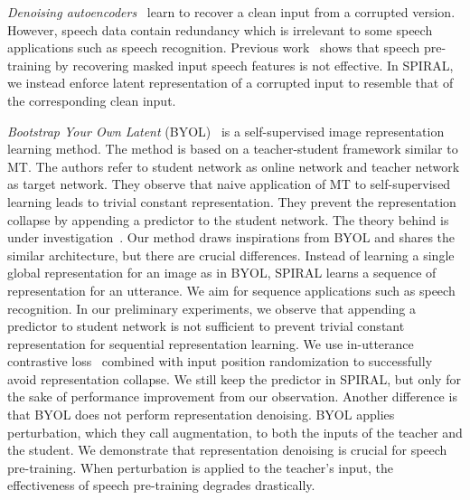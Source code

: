 \textit{Denoising autoencoders}~\citep{dae2008} learn to recover a clean input from a corrupted version. 
However, speech data contain redundancy which is irrelevant to some speech applications such as speech recognition. 
Previous work~\citep{baevski2019effectiveness} shows that speech pre-training by recovering masked input speech features is not effective.
In SPIRAL, we instead enforce latent representation of a corrupted input to resemble that of the corresponding clean input.

\textit{Bootstrap Your Own Latent} (BYOL)~\citep{Grill2020} is a self-supervised image representation learning method. The method is based on a teacher-student framework similar to MT. The authors refer to student network as online network and teacher network as target network. They observe that naive application of MT to self-supervised learning leads to trivial constant representation. They prevent the representation collapse by appending a predictor to the student network. The theory behind is under investigation~\citep{chen2021exploring, tian21a}.
Our method draws inspirations from BYOL and shares the similar architecture, but there are crucial differences.
Instead of learning a single global representation for an image as in BYOL, SPIRAL learns a sequence of representation for an utterance. We aim for sequence applications such as speech recognition.
In our preliminary experiments, we observe that appending a predictor to student network is not sufficient to prevent trivial constant representation for sequential representation learning.
We use in-utterance contrastive loss~\citep{wav2vec2} combined with input position randomization to successfully avoid representation collapse.
We still keep the predictor in SPIRAL, but only for the sake of performance improvement from our observation.
Another difference is that BYOL does not perform representation denoising. BYOL applies perturbation, which they call augmentation, to both the inputs of the teacher and the student. 
We demonstrate that representation denoising is crucial for speech pre-training. When perturbation is applied to the teacher's input, the effectiveness of speech pre-training degrades drastically.

